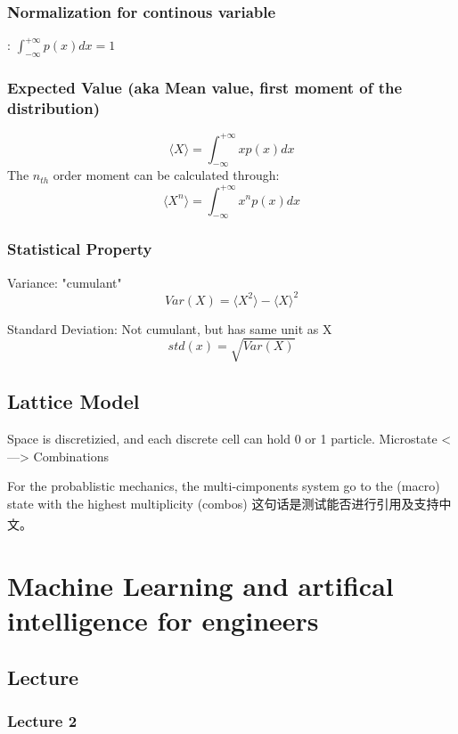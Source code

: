 \documentclass[a4paper]{article}
\newcommand{\upcite}[1]{\textsuperscript{\cite{#1}}}
\begin{document}
\subsubsection{Normalization for continous variable}:
$\int_{-\infty}^{+\infty} p(x)dx = 1$
\subsubsection{Expected Value (aka Mean value, first moment of the distribution)}
\begin{equation}
	\langle X \rangle=\int_{-\infty}^{+\infty}xp(x)dx
\end{equation}
The $n_{th}$ order moment can be calculated through:
\begin{equation}
	\langle X^{n} \rangle = \int_{-\infty}^{+\infty}x^{n}p(x) dx
\end{equation}

\subsubsection{Statistical Property}
Variance: "cumulant"
\begin{equation}
	Var(X)=\langle X^{2} \rangle - {\langle X \rangle}^{2}
\end{equation}

Standard Deviation: Not cumulant, but has same unit as X
\begin{equation}
	std(x)=\sqrt{Var(X)}
\end{equation}

\subsection{Lattice Model}
Space is discretizied, and each discrete cell can hold 0 or 1 particle.
Microstate <---> Combinations

For the probablistic mechanics, the multi-cimponents system go to the (macro) state with the highest multiplicity (combos)
这句话是测试能否进行引用及支持中文\upcite{1}。

\section{Machine Learning and artifical intelligence for engineers}
\subsection{Lecture}

\subsubsection{Lecture 2}
\end{document}
